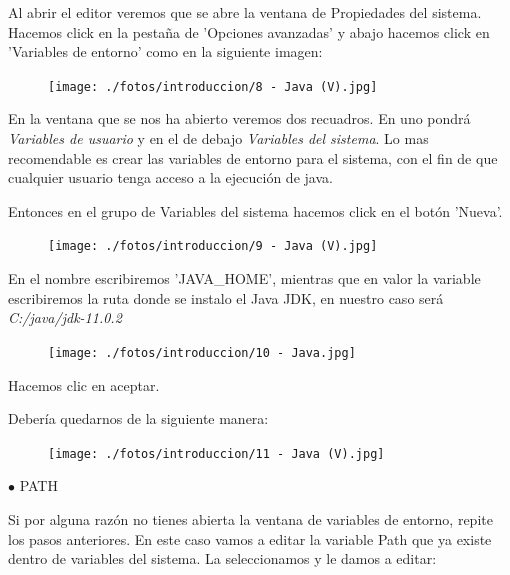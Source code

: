 \documentclass[a4paper,10pt]{article}
\begin{document}
Al abrir el editor veremos que se abre la ventana de Propiedades del sistema. Hacemos click en la pestaña de 'Opciones avanzadas' y abajo hacemos click en 'Variables de entorno' como en la siguiente imagen:

\begin{figure}[H]
\begin{center}
\texttt{[image: ./fotos/introduccion/8 - Java (V).jpg]}
\end{center}
\end{figure}

En la ventana que se nos ha abierto veremos dos recuadros. En uno pondrá \textit{Variables de usuario} y en el de debajo \textit{Variables del sistema}. Lo mas recomendable es crear las variables de entorno para el sistema, con el fin de que cualquier usuario tenga acceso a la ejecución de java. 

Entonces en el grupo de Variables del sistema hacemos click en el botón 'Nueva'.

\begin{figure}[H]
\begin{center}
\texttt{[image: ./fotos/introduccion/9 - Java (V).jpg]}
\end{center}
\end{figure}

En el nombre escribiremos 'JAVA\_HOME', mientras que en valor la variable escribiremos la ruta donde se instalo el Java JDK, en nuestro caso será \textit{C:/java/jdk-11.0.2}

\begin{figure}[H]
\begin{center}
\texttt{[image: ./fotos/introduccion/10 - Java.jpg]}
\end{center}
\end{figure}

Hacemos clic en aceptar.

\clearpage

Debería quedarnos de la siguiente manera:

\begin{figure}[H]
\begin{center}
\texttt{[image: ./fotos/introduccion/11 - Java (V).jpg]}
\end{center}
\end{figure}

$\bullet$ PATH 

Si por alguna razón no tienes abierta la ventana de variables de entorno, repite los pasos anteriores. En este caso vamos a editar la variable Path que ya existe dentro de variables del sistema. La seleccionamos y le damos a editar:
\end{document}

